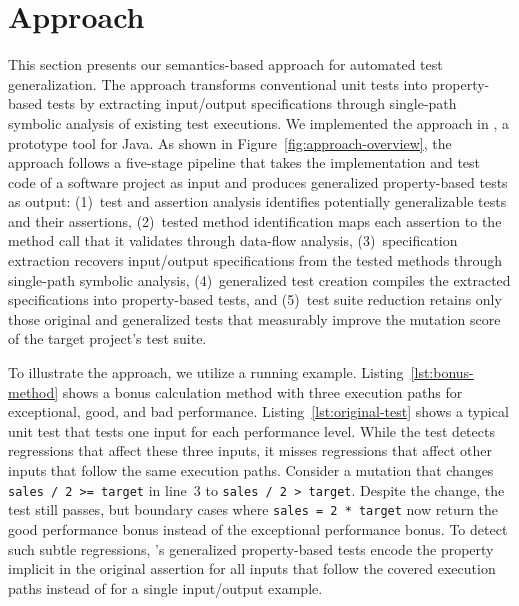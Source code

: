 \section{Approach}
\label{sec:approach}

This section presents our semantics-based approach for automated test generalization.
The approach transforms conventional unit tests into property-based tests
by extracting input/output specifications
through single-path symbolic analysis of existing test executions.
We implemented the approach in \ToolTeralizer{}, a prototype tool for Java.
As shown in Figure~\ref{fig:approach-overview}, the approach follows a five-stage pipeline
that takes the implementation and test code of a software project as input
and produces generalized property-based tests as output:
(1)~test and assertion analysis identifies potentially generalizable tests and their assertions,
(2)~tested method identification maps each assertion to the method call that it validates through data-flow analysis,
(3)~specification extraction recovers input/output specifications from the tested methods through single-path symbolic analysis,
(4)~generalized test creation compiles the extracted specifications into property-based tests,
and (5)~test suite reduction retains only those original and generalized tests that measurably improve the mutation score of the target project's test suite.

To illustrate the approach, we utilize a running example.
Listing~\ref{lst:bonus-method} shows a bonus calculation method with three execution paths
for exceptional, good, and bad performance.
Listing~\ref{lst:original-test} shows a typical unit test
that tests one input for each performance level.
While the test detects regressions that affect these three inputs,
it misses regressions that affect other inputs that follow the same execution paths.
Consider a mutation that changes \texttt{sales / 2 >= target} in line~3 to \texttt{sales / 2 > target}.
Despite the change, the test still passes,
but boundary cases where \texttt{sales = 2 * target} now
return the good performance bonus instead of the exceptional performance bonus.
To detect such subtle regressions, \ToolTeralizer{}'s generalized property-based tests
encode the property implicit in the original assertion for all inputs that follow the covered execution paths
instead of for a single input/output example.

